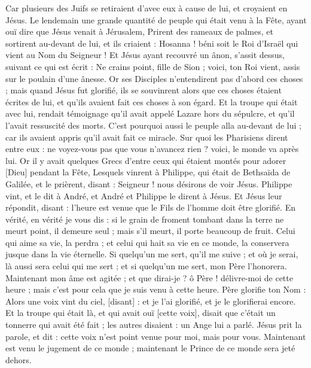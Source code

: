 \begin{multicols}{2}
Car plusieurs des Juifs se retiraient d'avec eux à cause de lui, et croyaient en Jésus.
Le lendemain une grande quantité de peuple qui était venu à la Fête, ayant ouï dire que Jésus venait à Jérusalem,
Prirent des rameaux de palmes, et sortirent au-devant de lui, et ils criaient : Hosanna ! béni soit le Roi d'Israël qui vient au Nom du Seigneur !
Et Jésus ayant recouvré un ânon, s'assit dessus, suivant ce qui est écrit :
Ne crains point, fille de Sion ; voici, ton Roi vient, assis sur le poulain d'une ânesse.
Or ses Disciples n'entendirent pas d'abord ces choses ; mais quand Jésus fut glorifié, ils se souvinrent alors que ces choses étaient écrites de lui, et qu'ils avaient fait ces choses à son égard.
Et la troupe qui était avec lui, rendait témoignage qu'il avait appelé Lazare hors du sépulcre, et qu'il l'avait ressuscité des morts.
C'est pourquoi aussi le peuple alla au-devant de lui ; car ils avaient appris qu'il avait fait ce miracle.
Sur quoi les Pharisiens dirent entre eux : ne voyez-vous pas que vous n'avancez rien ? voici, le monde va après lui.
Or il y avait quelques Grecs d'entre ceux qui étaient montés pour adorer [Dieu] pendant la Fête,
Lesquels vinrent à Philippe, qui était de Bethsaïda de Galilée, et le prièrent, disant : Seigneur ! nous désirons de voir Jésus.
Philippe vint, et le dit à André, et André et Philippe le dirent à Jésus.
Et Jésus leur répondit, disant : l'heure est venue que le Fils de l'homme doit être glorifié.
En vérité, en vérité je vous dis : si le grain de froment tombant dans la terre ne meurt point, il demeure seul ; mais s'il meurt, il porte beaucoup de fruit.
Celui qui aime sa vie, la perdra ; et celui qui hait sa vie en ce monde, la conservera jusque dans la vie éternelle.
Si quelqu'un me sert, qu'il me suive ; et où je serai, là aussi sera celui qui me sert ; et si quelqu'un me sert, mon Père l'honorera.
Maintenant mon âme est agitée ; et que dirai-je ? ô Père ! délivre-moi de cette heure ; mais c'est pour cela que je suis venu à cette heure.
Père glorifie ton Nom : Alors une voix vint du ciel, [disant] : et je l'ai glorifié, et je le glorifierai encore.
Et la troupe qui était là, et qui avait ouï [cette voix], disait que c'était un tonnerre qui avait été fait ; les autres disaient : un Ange lui a parlé.
Jésus prit la parole, et dit : cette voix n'est point venue pour moi, mais pour vous.
Maintenant est venu le jugement de ce monde ; maintenant le Prince de ce monde sera jeté dehors.

\end{multicols}
